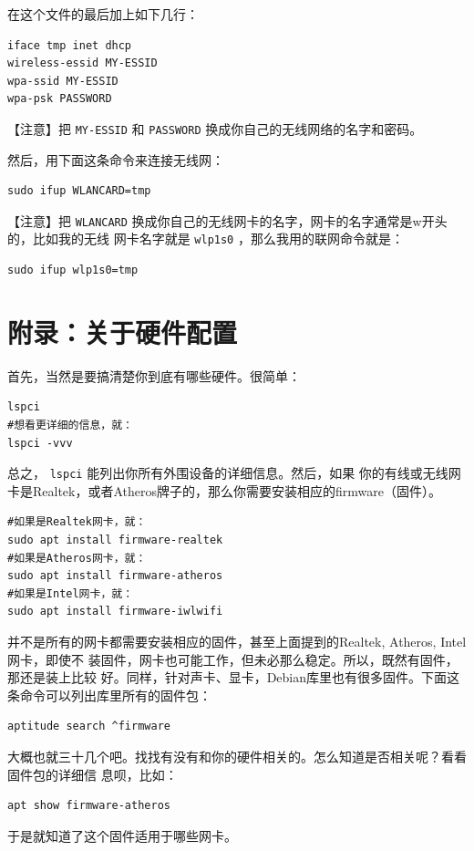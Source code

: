 \documentclass{wx672ctexart} \usepackage{hyperref}
\begin{document}
在这个文件的最后加上如下几行：
\begin{verbatim}
iface tmp inet dhcp
wireless-essid MY-ESSID
wpa-ssid MY-ESSID
wpa-psk PASSWORD
\end{verbatim}
【注意】把 \texttt{MY-ESSID} 和 \texttt{PASSWORD} 换成你自己的无线网络的名字和密码。

然后，用下面这条命令来连接无线网：
\begin{verbatim}
sudo ifup WLANCARD=tmp
\end{verbatim}
【注意】把 \texttt{WLANCARD} 换成你自己的无线网卡的名字，网卡的名字通常是w开头的，比如我的无线
网卡名字就是 \texttt{wlp1s0} ，那么我用的联网命令就是：
\begin{verbatim}
sudo ifup wlp1s0=tmp
\end{verbatim}

\section{附录：关于硬件配置}
\label{sec:org81b3258}
首先，当然是要搞清楚你到底有哪些硬件。很简单：
\begin{verbatim}
lspci
#想看更详细的信息，就：
lspci -vvv
\end{verbatim}

总之， \texttt{lspci} 能列出你所有外围设备的详细信息。然后，如果
你的有线或无线网卡是Realtek，或者Atheros牌子的，那么你需要安装相应的firmware（固件）。
\begin{verbatim}
#如果是Realtek网卡，就：
sudo apt install firmware-realtek
#如果是Atheros网卡，就：
sudo apt install firmware-atheros
#如果是Intel网卡，就：
sudo apt install firmware-iwlwifi
\end{verbatim}

并不是所有的网卡都需要安装相应的固件，甚至上面提到的Realtek, Atheros, Intel网卡，即使不
装固件，网卡也可能工作，但未必那么稳定。所以，既然有固件，那还是装上比较
好。同样，针对声卡、显卡，Debian库里也有很多固件。下面这条命令可以列出库里所有的固件包：
\begin{verbatim}
aptitude search ^firmware
\end{verbatim}
大概也就三十几个吧。找找有没有和你的硬件相关的。怎么知道是否相关呢？看看固件包的详细信
息呗，比如：
\begin{verbatim}
apt show firmware-atheros
\end{verbatim}
于是就知道了这个固件适用于哪些网卡。
\end{document}
